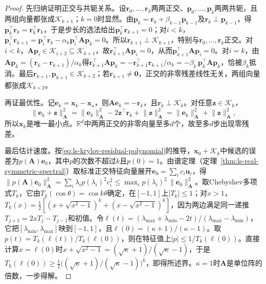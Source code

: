 \begin{proof}
先归纳证明正交与共轭关系。设$\bm r_0,\ldots,\bm r_k$两两正交、$\bm p_0,\ldots,\bm p_k$两两共轭，且两组向量都张成$\mathcal K_{k+1}$；$k=0$时显然。由$\bm p_k=\bm r_k+\beta_{k-1}\bm p_{k-1}$及$\bm r_k\perp\bm p_{k-1}$，得$\bm p_k^\top\bm r_k=\bm r_k^\top\bm r_k$，于是步长的选法给出$\bm p_k^\top\bm r_{k+1}=0$；对$i<k$，$\bm p_i^\top\bm r_{k+1}=\bm p_i^\top\bm r_k-\alpha_k\bm p_i^\top\bm A\bm p_k=0$。所以$\bm r_{k+1}\perp\mathcal K_{k+1}$，特别与$\bm r_0,\ldots,\bm r_k$正交。对$i<k$，$\bm A\bm p_i\in\mathcal K_{i+2}\subseteq\mathcal K_{k+1}$，故$\bm r_{k+1}^\top\bm A\bm p_i=0$，从而$\bm p_{k+1}^\top\bm A\bm p_i=0$。对$i=k$，由$\bm A\bm p_k=(\bm r_k-\bm r_{k+1})/\alpha_k$得$\bm r_{k+1}^\top\bm A\bm p_k=-\bm r_{k+1}^\top\bm r_{k+1}/\alpha_k=-\beta_k\,\bm p_k^\top\bm A\bm p_k$，恰被$\beta_k$抵消。最后$\bm r_{k+1},\bm p_{k+1}\in\mathcal K_{k+2}$；若$\bm r_{k+1}\ne\bm 0$，正交的非零残差线性无关，两组向量都张成$\mathcal K_{k+2}$。

再证最优性。记$\bm e_k=\bm x_k-\bm x_\star$，则$\bm A\bm e_k=-\bm r_k$，且$\bm r_k\perp\mathcal K_k$。对任意$\bm z\in\mathcal K_k$，
\[
 \lVert\bm e_k+\bm z\rVert_{\bm A}^2
 =\lVert\bm e_k\rVert_{\bm A}^2-2\bm z^\top\bm r_k+\lVert\bm z\rVert_{\bm A}^2
 =\lVert\bm e_k\rVert_{\bm A}^2+\lVert\bm z\rVert_{\bm A}^2,
\]
所以$\bm x_k$是唯一最小点。$\mathbb R^d$中两两正交的非零向量至多$d$个，故至多$d$步出现零残差。

最后估计速度。按\eqref{eq:ls-krylov-residual-polynomial}的推导，$\bm x_0+\mathcal K_k$中候选的误差为$p(\bm A)\bm e_0$，其中$p$的次数不超过$k$且$p(0)=1$。由谱定理（定理~\ref{thm:ls-real-symmetric-spectral}）取标准正交特征向量展开$\bm e_0=\sum_ic_i\bm u_i$，得$\lVert p(\bm A)\bm e_0\rVert_{\bm A}^2=\sum_i\lambda_ip(\lambda_i)^2c_i^2\le\max_ip(\lambda_i)^2\,\lVert\bm e_0\rVert_{\bm A}^2$。取Chebyshev多项式$T_k$，它由$T_k(\cos\theta)=\cos k\theta$确定，在$[-1,1]$上$\lvert T_k\rvert\le1$；对$x>1$，$T_k(x)=\tfrac12[(x+\sqrt{x^2-1})^k+(x-\sqrt{x^2-1})^k]$，因为两边满足同一递推$T_{j+1}=2xT_j-T_{j-1}$和初值。令$\ell(t)=(\lambda_{\max}+\lambda_{\min}-2t)/(\lambda_{\max}-\lambda_{\min})$，它把$[\lambda_{\min},\lambda_{\max}]$映到$[-1,1]$，且$\ell(0)=(\kappa+1)/(\kappa-1)$。取$p(t)=T_k(\ell(t))/T_k(\ell(0))$，则在特征值上$\lvert p\rvert\le1/T_k(\ell(0))$。直接计算$x=\ell(0)$时$x+\sqrt{x^2-1}=(\sqrt\kappa+1)/(\sqrt\kappa-1)$，于是$T_k(\ell(0))\ge\tfrac12\bigl((\sqrt\kappa+1)/(\sqrt\kappa-1)\bigr)^k$，即得所述界。$\kappa=1$时$\bm A$是单位阵的倍数，一步得解。
\end{proof}

